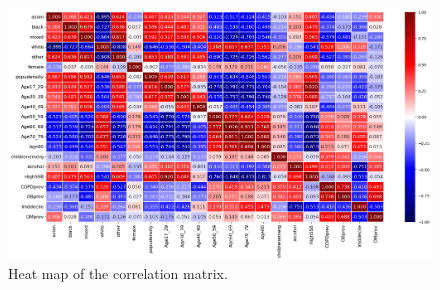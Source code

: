 \vspace{10pt}

\begin{figure}[ht]
  \centering
  \includegraphics[width=.99\linewidth]{ucl-latex-thesis-templates-master/Image/methods_corrmatrix_2.png}
  \caption{Heat map of the correlation matrix.}
  \label{fig:A4.5}
\end{figure}%



